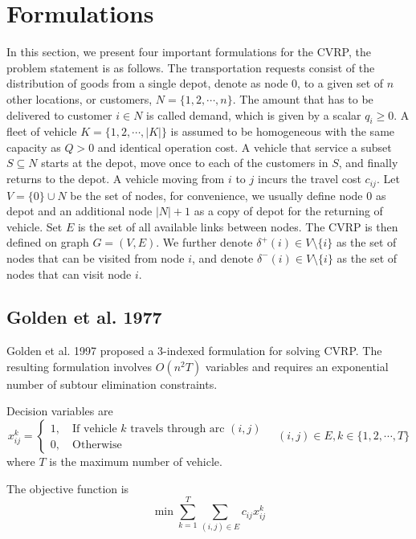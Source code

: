 			\section{Formulations}
				In this section, we present four important formulations for the CVRP, the problem statement is as follows. The transportation requests consist of the distribution of goods from a single depot, denote as node 0, to a given set of $n$ other locations, or customers, $N = \{1, 2, \cdots, n\}$. The amount that has to be delivered to customer $i \in N$ is called demand, which is given by a scalar $q_i \ge 0$. A fleet of vehicle $K = \{1, 2, \cdots, |K|\}$ is assumed to be homogeneous with the same capacity as $Q > 0$ and identical operation cost. A vehicle that service a subset $S\subseteq N$ starts at the depot, move once to each of the customers in $S$, and finally returns to the depot. A vehicle moving from $i$ to $j$ incurs the travel cost $c_{ij}$. 
				Let $V = \{0\} \cup N$ be the set of nodes, for convenience, we usually define node 0 as depot and an additional node $|N|+1$ as a copy of depot for the returning of vehicle. Set $E$ is the set of all available links between nodes. The CVRP is then defined on graph $G = (V, E)$. We further denote $\delta^+(i) \in V \setminus \{i\}$ as the set of nodes that can be visited from node $i$, and denote $\delta^-(i) \in V\setminus \{i\}$ as the set of nodes that can visit node $i$.

				\subsection{Golden et al. 1977}
					Golden et al. 1997 proposed a 3-indexed formulation for solving CVRP. The resulting formulation involves $O(n^2T)$ variables and requires an exponential number of subtour elimination constraints. 

					Decision variables are
					\begin{equation*}
						x_{ij}^k = \begin{cases}
										1, \quad \text{If vehicle } k \text{ travels through arc } (i, j) \\
										0, \quad \text{Otherwise}
									\end{cases} \quad (i, j) \in E, k \in \{1, 2, \cdots, T\}
					\end{equation*}
					where $T$ is the maximum number of vehicle.

					The objective function is
					\begin{equation*}
						\min \sum_{k = 1}^T \sum_{(i, j) \in E} c_{ij} x_{ij}^k
					\end{equation*}


